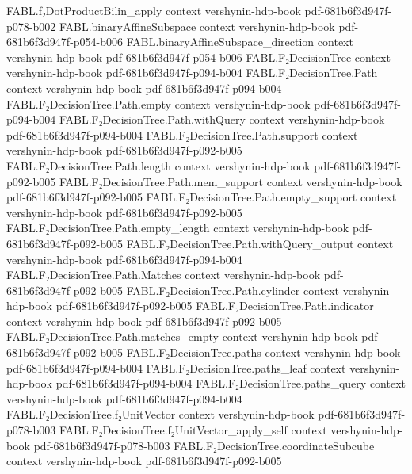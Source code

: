 \begin{theorem}
  {FABL.f₂DotProductBilin_apply}
  {context}
  {vershynin-hdp-book}
  {pdf-681b6f3d947f-p078-b002}
\proofstep
  {FABL.binaryAffineSubspace}
  {context}
  {vershynin-hdp-book}
  {pdf-681b6f3d947f-p054-b006}
\proofstep
  {FABL.binaryAffineSubspace_direction}
  {context}
  {vershynin-hdp-book}
  {pdf-681b6f3d947f-p054-b006}
\proofstep
  {FABL.F₂DecisionTree}
  {context}
  {vershynin-hdp-book}
  {pdf-681b6f3d947f-p094-b004}
\proofstep
  {FABL.F₂DecisionTree.Path}
  {context}
  {vershynin-hdp-book}
  {pdf-681b6f3d947f-p094-b004}
\proofstep
  {FABL.F₂DecisionTree.Path.empty}
  {context}
  {vershynin-hdp-book}
  {pdf-681b6f3d947f-p094-b004}
\proofstep
  {FABL.F₂DecisionTree.Path.withQuery}
  {context}
  {vershynin-hdp-book}
  {pdf-681b6f3d947f-p094-b004}
\proofstep
  {FABL.F₂DecisionTree.Path.support}
  {context}
  {vershynin-hdp-book}
  {pdf-681b6f3d947f-p092-b005}
\proofstep
  {FABL.F₂DecisionTree.Path.length}
  {context}
  {vershynin-hdp-book}
  {pdf-681b6f3d947f-p092-b005}
\proofstep
  {FABL.F₂DecisionTree.Path.mem_support}
  {context}
  {vershynin-hdp-book}
  {pdf-681b6f3d947f-p092-b005}
\proofstep
  {FABL.F₂DecisionTree.Path.empty_support}
  {context}
  {vershynin-hdp-book}
  {pdf-681b6f3d947f-p092-b005}
\proofstep
  {FABL.F₂DecisionTree.Path.empty_length}
  {context}
  {vershynin-hdp-book}
  {pdf-681b6f3d947f-p092-b005}
\proofstep
  {FABL.F₂DecisionTree.Path.withQuery_output}
  {context}
  {vershynin-hdp-book}
  {pdf-681b6f3d947f-p094-b004}
\proofstep
  {FABL.F₂DecisionTree.Path.Matches}
  {context}
  {vershynin-hdp-book}
  {pdf-681b6f3d947f-p092-b005}
\proofstep
  {FABL.F₂DecisionTree.Path.cylinder}
  {context}
  {vershynin-hdp-book}
  {pdf-681b6f3d947f-p092-b005}
\proofstep
  {FABL.F₂DecisionTree.Path.indicator}
  {context}
  {vershynin-hdp-book}
  {pdf-681b6f3d947f-p092-b005}
\proofstep
  {FABL.F₂DecisionTree.Path.matches_empty}
  {context}
  {vershynin-hdp-book}
  {pdf-681b6f3d947f-p092-b005}
\proofstep
  {FABL.F₂DecisionTree.paths}
  {context}
  {vershynin-hdp-book}
  {pdf-681b6f3d947f-p094-b004}
\proofstep
  {FABL.F₂DecisionTree.paths_leaf}
  {context}
  {vershynin-hdp-book}
  {pdf-681b6f3d947f-p094-b004}
\proofstep
  {FABL.F₂DecisionTree.paths_query}
  {context}
  {vershynin-hdp-book}
  {pdf-681b6f3d947f-p094-b004}
\proofstep
  {FABL.F₂DecisionTree.f₂UnitVector}
  {context}
  {vershynin-hdp-book}
  {pdf-681b6f3d947f-p078-b003}
\proofstep
  {FABL.F₂DecisionTree.f₂UnitVector_apply_self}
  {context}
  {vershynin-hdp-book}
  {pdf-681b6f3d947f-p078-b003}
\proofstep
  {FABL.F₂DecisionTree.coordinateSubcube}
  {context}
  {vershynin-hdp-book}
  {pdf-681b6f3d947f-p092-b005}

\end{theorem}
